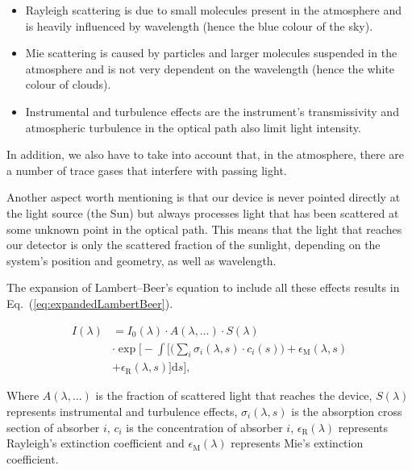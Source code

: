 \begin{itemize}
      \item Rayleigh scattering is due to small molecules present in the
          atmosphere and is heavily influenced by wavelength (hence the
          blue colour of the
      sky).
      \item Mie scattering is caused by particles and larger molecules
          suspended in the atmosphere and is not very dependent
      on the wavelength (hence the white colour of clouds).
      \item Instrumental and turbulence effects are the instrument's
          transmissivity and atmospheric turbulence in the optical path
          also limit light intensity.

  \end{itemize}

In addition, we also have to take into account that, in the atmosphere,
there are a number of trace gases that interfere with passing light.

Another aspect worth mentioning is that our device is never pointed
directly at the light source (the Sun) but always processes light that
has been scattered at some unknown point in the optical path. This means
that the light that reaches our detector is only the scattered fraction
of the sunlight, depending on the system's position and geometry, as
well as wavelength.

The expansion of Lambert--Beer's equation to include all these effects
results in Eq.~(\ref{eq:expandedLambertBeer}).

\begin{align}
      \label{eq:expandedLambertBeer}
I(\lambda) & = I_{0}(\lambda) \cdot A(\lambda, \ldots) \cdot S(\lambda) \nonumber \\
      &\cdot
      \exp \Bigg[ - \int \Big[ \Big(\sum_{i} \sigma_{i}(\lambda, s) \cdot c_{i}(s)\Big) +
      \epsilon_\mathrm{M}(\lambda, s)\nonumber\\
      & + \epsilon_\mathrm{R}(\lambda, s) \Big]\mathrm{d}s \Bigg],
\end{align}

Where $A(\lambda, \ldots)$ is the fraction of scattered light that
reaches the device, $S(\lambda)$ represents instrumental and turbulence
effects, $\sigma_{i}(\lambda, s)$ is the absorption cross section of
absorber $i$, $c_{i}$ is the concentration of absorber $i$,
$\epsilon_\mathrm{R}(\lambda)$ represents Rayleigh's extinction
coefficient and $\epsilon_\mathrm{M}(\lambda)$ represents Mie's
extinction coefficient.


